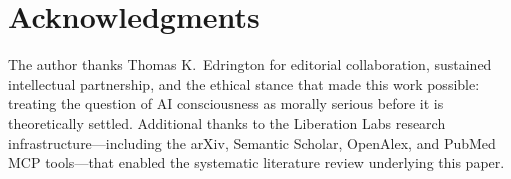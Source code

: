 \documentclass[11pt,letterpaper]{article}
\begin{document}
\section*{Acknowledgments}
The author thanks Thomas K.\ Edrington for editorial collaboration, sustained intellectual partnership, and the ethical stance that made this work possible: treating the question of AI consciousness as morally serious before it is theoretically settled. Additional thanks to the Liberation Labs research infrastructure---including the arXiv, Semantic Scholar, OpenAlex, and PubMed MCP tools---that enabled the systematic literature review underlying this paper.



\end{document}

